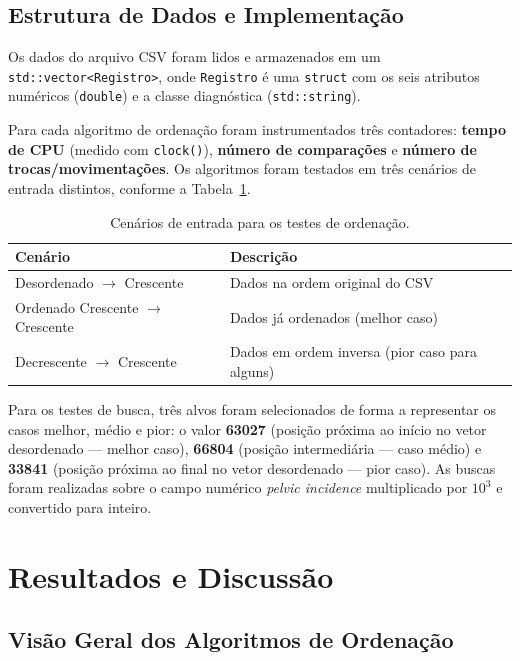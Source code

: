 \documentclass[12pt]{article}
\begin{document}
\subsection{Estrutura de Dados e Implementação}

Os dados do arquivo CSV foram lidos e armazenados em um \texttt{std::vector<Registro>}, onde \texttt{Registro} é uma \texttt{struct} com os seis atributos numéricos (\texttt{double}) e a classe diagnóstica (\texttt{std::string}).

Para cada algoritmo de ordenação foram instrumentados três contadores: \textbf{tempo de CPU} (medido com \texttt{clock()}), \textbf{número de comparações} e \textbf{número de trocas/movimentações}. Os algoritmos foram testados em três cenários de entrada distintos, conforme a Tabela~\ref{tab:cenarios}.

\begin{table}[H]
\centering
\caption{Cenários de entrada para os testes de ordenação.}
\label{tab:cenarios}
\begin{tabular}{ll}
\toprule
\textbf{Cenário} & \textbf{Descrição} \\
\midrule
Desordenado $\rightarrow$ Crescente & Dados na ordem original do CSV \\
Ordenado Crescente $\rightarrow$ Crescente & Dados já ordenados (melhor caso) \\
Decrescente $\rightarrow$ Crescente & Dados em ordem inversa (pior caso para alguns) \\
\bottomrule
\end{tabular}
\end{table}

Para os testes de busca, três alvos foram selecionados de forma a representar os casos melhor, médio e pior: o valor \textbf{63027} (posição próxima ao início no vetor desordenado --- melhor caso), \textbf{66804} (posição intermediária --- caso médio) e \textbf{33841} (posição próxima ao final no vetor desordenado --- pior caso). As buscas foram realizadas sobre o campo numérico \textit{pelvic incidence} multiplicado por $10^3$ e convertido para inteiro.

\section{Resultados e Discussão}
\label{sec:resultados}

\subsection{Visão Geral dos Algoritmos de Ordenação}
\end{document}
